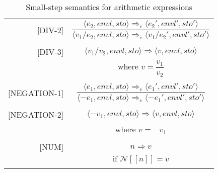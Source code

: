 \begin{longtable}[c] { r c }
  [DIV-2] & 
    \( \dfrac { \langle e_2, envl, sto \rangle \Rightarrow_e \langle e_2', envl', sto' \rangle }
      {\langle v_1 / e_2, envl, sto \rangle \Rightarrow_e \langle v_1 / e_2', envl', sto' \rangle } \) \\
  & \\

  [DIV-3] & 
    \( \langle v_1 / v_2, envl, sto \rangle \Rightarrow \langle v, envl, sto \rangle \) \\
  & where \( v = \dfrac{ v_1 }{ v_2 } \) \\
  & \\

  [NEGATION-1] & 
    \( \dfrac { \langle e_1, envl, sto \rangle \Rightarrow_e \langle e_1', envl', sto' \rangle }
      {\langle -e_1, envl, sto \rangle \Rightarrow_e \langle -e_1', envl', sto' \rangle } \) \\
  & \\

  [NEGATION-2] & 
    \( \langle -v_1, envl, sto \rangle \Rightarrow \langle v, envl, sto \rangle \) \\
  & where \( v = -v_1 \)\\
  & \\

  [NUM] & 
    \( n \Rightarrow v \) \\
  & \( \text{if } \mathcal{N} [[n]] = v \) \\

  \caption{Small-step semantics for arithmetic expressions}
\end{longtable}

